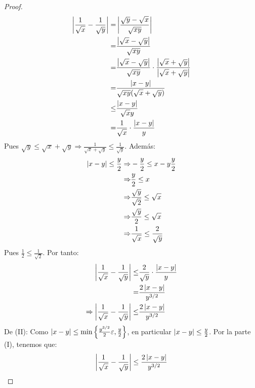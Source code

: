 \documentclass[12pt]{article}
\begin{document}
\begin{enumerate}
\begin{proof}
\begin{equation*}
\begin{split}
                \left| \frac{1}{\sqrt{x}}-\frac{1}{\sqrt{y}} \right|=&\left| \frac{\sqrt{y}-\sqrt{x}}{\sqrt{xy}} \right|\\
                =&\frac{\left| \sqrt{x}-\sqrt{y} \right|}{\sqrt{xy}}\\
                =&\frac{\left| \sqrt{x}-\sqrt{y} \right|}{\sqrt{xy}}\cdot\frac{\left| \sqrt{x}+\sqrt{y} \right|}{\left| \sqrt{x}+\sqrt{y} \right|}\\
                =&\frac{\left| x-y \right|}{\sqrt{xy}(\sqrt{x}+\sqrt{y})}\\
                \leq&\frac{\left| x-y \right|}{\sqrt{x}y}\\
                =&\frac{1}{\sqrt{x}}\cdot\frac{\left| x-y \right|}{y}
            \end{split}
        \end{equation*}
        Pues $\sqrt{y}\leq\sqrt{x}+\sqrt{y}\Rightarrow\frac{1}{\sqrt{x}+\sqrt{y}}\leq\frac{1}{\sqrt{y}}$. Además:
        \begin{equation*}
            \begin{split}
                \left| x-y \right|\leq\frac{y}{2}\Rightarrow&-\frac{y}{2}\leq x-y\frac{y}{2}\\
                \Rightarrow&\frac{y}{2}\leq x\\
                \Rightarrow&\frac{\sqrt{y}}{\sqrt{2}}\leq \sqrt{x}\\
                \Rightarrow&\frac{\sqrt{y}}{2}\leq \sqrt{x}\\
                \Rightarrow&\frac{1}{\sqrt{x}}\leq\frac{2}{\sqrt{y}}
            \end{split}
        \end{equation*}
        Pues $\frac{1}{2}\leq\frac{1}{\sqrt{2}}$. Por tanto:
        \begin{equation*}
            \begin{split}
                \left| \frac{1}{\sqrt{x}}-\frac{1}{\sqrt{y}} \right|\leq&\frac{2}{\sqrt{y}}\cdot\frac{\left| x-y \right|}{y}\\
                =&\frac{2\left| x-y \right|}{y^{3/2}}\\
                \Rightarrow\left| \frac{1}{\sqrt{x}}-\frac{1}{\sqrt{y}} \right|\leq&\frac{2\left| x-y \right|}{y^{3/2}}
            \end{split}
        \end{equation*}
        De (II): Como $\left| x-y \right|\leq\min\left\{\frac{y^{3/2}}{2}\varepsilon,\frac{y}{2}\right\}$, en particular $\left| x-y \right|\leq\frac{y}{2}$. Por la parte (I), tenemos que:
        \begin{equation*}
            \abs{\frac{1}{\sqrt{x}}-\frac{1}{\sqrt{y}}}\leq\frac{2\abs{x-y}}{y^{3/2}}

\end{equation*}
\end{proof}
\end{enumerate}
\end{document}
